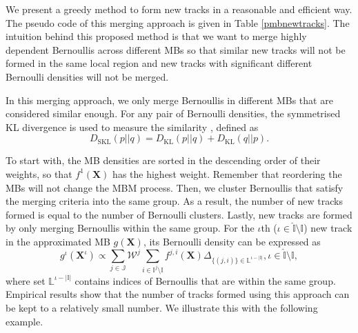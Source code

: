 \documentclass[journal]{IEEEtran}
\begin{document}
We present a greedy method to form new tracks in a reasonable and efficient way. The pseudo code of this merging approach is given in Table \ref{pmbnewtracks}. The intuition behind this proposed method is that we want to merge highly dependent Bernoullis across different MBs so that similar new tracks will not be formed in the same local region and new tracks with significant different Bernoulli densities will not be merged.

In this merging approach, we only merge Bernoullis in different MBs that are considered similar enough. For any pair of Bernoulli densities, the symmetrised KL divergence is used to measure the similarity \cite{ArdeshiriGOO:2015}, defined as
\begin{equation}
    D_{\text{SKL}}(p||q) = D_{\text{KL}}(p||q) + D_{\text{KL}}(q||p). 
\end{equation}

To start with, the MB densities are sorted in the descending order of their weights, so that $f^1(\mathbf{X})$ has the highest weight. Remember that reordering the MBs will not change the MBM process. Then, we cluster Bernoullis that satisfy the merging criteria into the same group. As a result, the number of new tracks formed is equal to the number of Bernoulli clusters. Lastly, new tracks are formed by only merging Bernoullis within the same group. For the $\iota$th ($\iota\in\hat{\mathbb{I}}\setminus\mathbb{I}$) new track in the approximated MB $g(\mathbf{X})$, its Bernoulli density can be expressed as
\begin{equation}
    g^{\iota}(\mathbf{X}^\iota) \propto \sum_{j\in\mathbb{J}}\mathcal{W}^j\sum_{i\in\mathbb{I}^j\setminus\mathbb{I}}f^{j,i}(\mathbf{X})\Delta_{\{(j,i)\}\in\mathbb{L}^{\iota-|\mathbb{I}|}}, \iota\in\hat{\mathbb{I}}\setminus\mathbb{I},
    \label{eq:approxnewtrack}
\end{equation}
where set $\mathbb{L}^{\iota-|\mathbb{I}|}$ contains indices of Bernoullis that are within the same group. Empirical results show that the number of tracks formed using this approach can be kept to a relatively small number. We illustrate this with the following example. 
\end{document}
